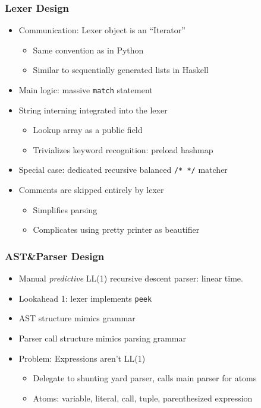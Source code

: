 \documentclass{article}
\begin{document}
\begin{frame}
    \frametitle{Lexer Design}
    \begin{itemize}[<+(1)->]
        \item Communication: Lexer object is an ``Iterator''
            \begin{itemize}[<+(1)->]
                \item Same convention as in Python
                \item Similar to sequentially generated lists in Haskell
            \end{itemize}
        \item Main logic: massive \texttt{match} statement
        \item String interning integrated into the lexer
            \begin{itemize}[<+(1)->]
                \item Lookup array as a public field
                \item Trivializes keyword recognition: preload hashmap
            \end{itemize}
        \item Special case: dedicated recursive balanced \texttt{/* */} matcher
        \item Comments are skipped entirely by lexer
            \begin{itemize}[<+(1)->]
                \item Simplifies parsing
                \item Complicates using pretty printer as beautifier
            \end{itemize}
    \end{itemize}
\end{frame}

\begin{frame}
    \frametitle{AST\&Parser Design}
    \begin{itemize}[<+(1)->]
        \item Manual \textit{predictive} LL(1) recursive descent parser: linear
            time.
        \item Lookahead 1: lexer implements \texttt{peek}
        \item AST structure mimics grammar
        \item Parser call structure mimics parsing grammar
        \item Problem: Expressions aren't LL(1) 
            \begin{itemize}[<+(1)->]
                \item Delegate to shunting yard parser, calls main parser for atoms
                \item Atoms: variable, literal, call, tuple, parenthesized expression
            \end{itemize}
    \end{itemize}
\end{frame}
\end{document}
